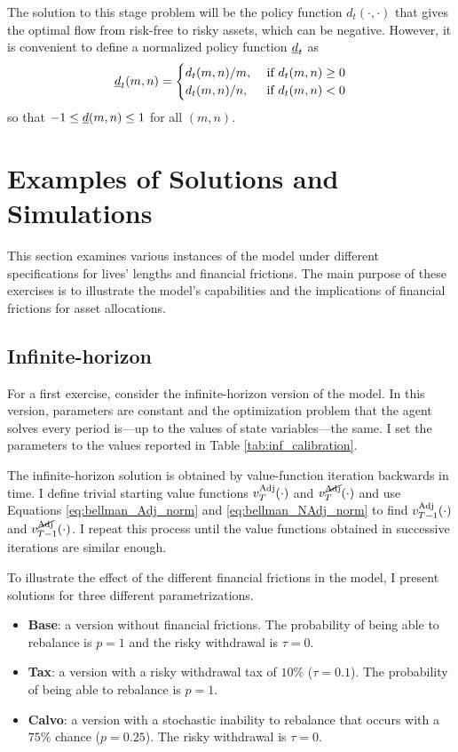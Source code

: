 \documentclass[./RiskyContrib.tex]{subfiles}
\begin{document}
The solution to this stage problem will be the policy function $d_t(\cdot, \cdot)$
that gives the optimal flow from risk-free to risky assets, which can be negative.
However, it is convenient to define a normalized policy function $\underline{d}_t$ as
\begin{equation*}
\underline{d}_t(m, n) = \begin{cases}
d_t(m,n)/m, & \text{ if } d_t(m,n) \geq 0 \\
d_t(m,n)/n, & \text{ if } d_t(m,n) < 0
\end{cases}
\end{equation*}
so that $-1 \leq \underline{d}(m,n) \leq 1$ for all $(m,n)$.

\hypertarget{Examples}{}
\section{Examples of Solutions and Simulations}

This section examines various instances of the model under
different specifications for lives' lengths and financial
frictions. The main purpose of these exercises is to illustrate
the model's capabilities and the implications of financial
frictions for asset allocations.

\subsection{Infinite-horizon}

For a first exercise, consider the infinite-horizon version of
the model. In this version, parameters are constant and the
optimization problem that the agent solves every period
is---up to the values of state variables---the same. I set
the parameters to the values reported in Table \ref{tab:inf_calibration}.



The infinite-horizon solution is obtained by value-function iteration
backwards in time. I define trivial starting value functions $v^{\text{Adj}}_T(\cdot)$
and $v^{\cancel{\text{Adj}}}_T(\cdot)$ and use Equations \ref{eq:bellman_Adj_norm} and
\ref{eq:bellman_NAdj_norm} to find $v^{\text{Adj}}_{T-1}(\cdot)$ and $v^{\cancel{\text{Adj}}}_{T-1}(\cdot)$.
I repeat this process until the value functions obtained in successive
iterations are similar enough.

To illustrate the effect of the different financial frictions in the
model, I present solutions for three different parametrizations.
\begin{itemize}
\item \textbf{Base}: a version without financial frictions. The probability
of being able to rebalance is $p = 1$ and the risky withdrawal is $\tau = 0$.
\item \textbf{Tax}: a version with a risky withdrawal tax of $10\%$ ($\tau = 0.1$).
The probability of being able to rebalance is $p = 1$.
\item \textbf{Calvo}: a version with a stochastic inability to rebalance that
occurs with a $75\%$ chance ($p = 0.25$). The risky withdrawal is $\tau = 0$.
\end{itemize}
\end{document}
